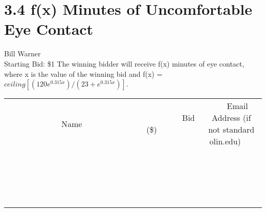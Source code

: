 \documentclass[11pt]{article}
\begin{document}
\section*{3.4 f(x) Minutes of Uncomfortable Eye Contact}
Bill Warner
\\
Starting Bid: \$1
\newline
The winning bidder will receive f(x) minutes of eye contact, where x is the value of the winning bid and f(x) = $ceiling[(120e^{0.315x})/(23 + e^{0.315x})]$.
\\[3ex]
\begin{tabular}{c c c}
~~~~~~~~~~~~~Name~~~~~~~~~~~~~ & ~~~~~~~~~Bid (\$)~~~~~~~~~  & ~~~Email Address (if not standard olin.edu)~~~\\
 & & \\
\hline
 & & \\
\hline
 & & \\
\hline
 & & \\
\hline
 & & \\
\hline
 & & \\
\hline
 & & \\
\hline
 & & \\
\hline
 & & \\
\hline
 & & \\
\hline
 & & \\
\hline
 & & \\
\hline
 & & \\
\hline
 & & \\
\hline
 & & \\
\hline
 & & \\
\hline
 & & \\
\hline
 & & \\
\hline
 & & \\
\hline
\end{tabular}
\newpage
\end{document}
